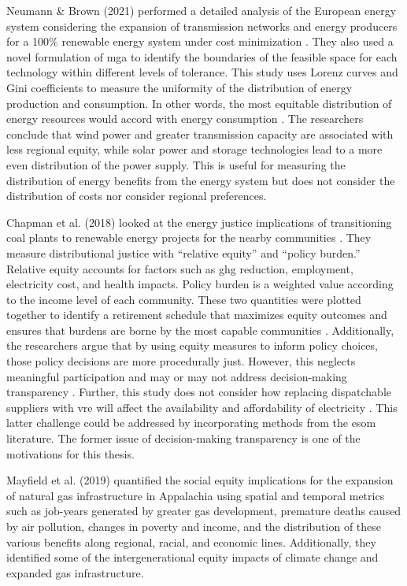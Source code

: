 Neumann \& Brown (2021) performed a detailed analysis of the European energy
system considering the expansion of transmission networks and energy producers
for a 100\% renewable energy system under cost minimization
\cite{neumann_near-optimal_2021}. They also used a novel formulation of \ac{mga}
to identify the boundaries of the feasible space for each technology within
different levels of tolerance. This study uses Lorenz curves and Gini
coefficients to measure the uniformity of the distribution of energy production
and consumption. In other words, the most equitable distribution of energy
resources would accord with energy consumption \cite{neumann_near-optimal_2021}.
The researchers conclude that wind power and greater transmission capacity are
associated with less regional equity, while solar power and storage technologies
lead to a more even distribution of the power supply. This is useful for
measuring the distribution of energy benefits from the energy system but does
not consider the distribution of costs nor consider regional preferences. 

Chapman et al. (2018) looked at the energy justice implications of transitioning
coal plants to renewable energy projects for the nearby communities
\cite{chapman_prioritizing_2018}. They measure distributional justice with
``relative equity'' and ``policy burden.'' Relative equity accounts for factors
such as \ac{ghg} reduction, employment, electricity cost, and health impacts.
Policy burden is a weighted value according to the income level of each
community. These two quantities were plotted together to identify a retirement
schedule that maximizes equity outcomes and ensures that burdens are borne by
the most capable communities \cite{chapman_prioritizing_2018}. Additionally, the
researchers argue that by using equity measures to inform policy choices, those
policy decisions are more procedurally just. However, this neglects meaningful
participation and may or may not address decision-making transparency
\cite{sovacool_energy_2015}. Further, this study does not consider how replacing
dispatchable suppliers with \ac{vre} will affect the availability and
affordability of electricity \cite{sovacool_energy_2015}. This latter challenge
could be addressed by incorporating methods from the \ac{esom} literature. The
former issue of decision-making transparency is one of the motivations for this
thesis.

Mayfield et al. (2019) quantified the social equity implications for the
expansion of natural gas infrastructure in Appalachia using spatial and temporal
metrics such as job-years generated by greater gas development, premature deaths
caused by air pollution, changes in poverty and income, and the distribution of
these various benefits along regional, racial, and economic lines. Additionally,
they identified some of the intergenerational equity impacts of climate change
and expanded gas infrastructure. 

